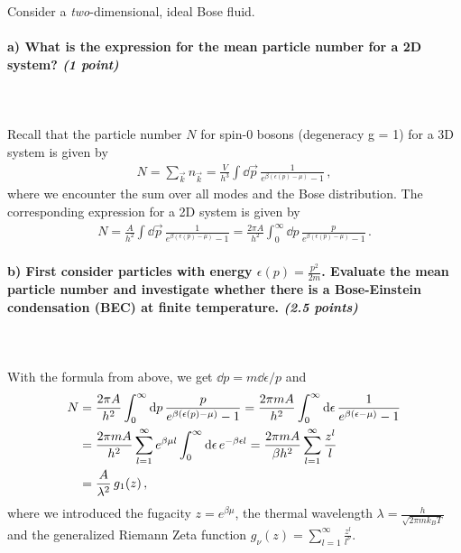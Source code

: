 Consider a \textit{two}-dimensional, ideal Bose fluid.

\paragraph{a) What is the expression for the mean particle number for a 2D system?
    \textit{(1 point)}
} \ \\
\\
Recall that the particle number $N$ for spin-0 bosons (degeneracy g = 1) 
for a 3D system is given by
\begin{align}
	N = \sum_{\vec{k}} n_{\vec{k}}
	= \frac{V}{h^3} \int \dd \vec{p} \, \frac{1}{e^{\beta (\epsilon(p) - \mu)}-1} \,,
\end{align}
where we encounter the sum over all modes and the Bose distribution. 
The corresponding expression for a 2D system is given by
\begin{align}
	N = \frac{A}{h^2} \int \dd \vec{p} \, \frac{1}{e^{\beta (\epsilon(p) - \mu)}-1}
	= \frac{2\pi A}{h^2} \int_0^{\infty} \dd p \, \frac{p}{e^{\beta (\epsilon(p) - \mu)}-1} \,.
\end{align}

\paragraph{b) First consider particles with energy $\epsilon(p)=\frac{p^2}{2m}$.
	Evaluate the mean particle number and investigate whether there is a Bose-Einstein 
	condensation (BEC) at finite temperature.
    \textit{(2.5 points)}
} \ \\
\\
With the formula from above, we get $\dd p = m \dd\epsilon / p$ and
\begin{align}
	N &= \frac{2\pi A}{h^2} \int_0^{\infty} \mathrm{d} p \, \frac{p}{e^{\beta (\epsilon(p) - \mu)}-1}
	= \frac{2\pi m A}{h^2} \int_0^{\infty} \mathrm{d}\epsilon \, \frac{1}{e^{\beta (\epsilon - \mu)}-1} \notag \\
	&= \frac{2\pi m A}{h^2} \sum_{l=1}^{\infty} e^{\beta\mu l} \int_0^{\infty} \mathrm{d}\epsilon \, e^{- \beta\epsilon l}
	= \frac{2\pi m A}{\beta h^2} \sum_{l=1}^{\infty} \frac{z^l}{l} \notag \\
	&= \frac{A}{\lambda^2} \, g_1(z) \,,
\end{align}
where we introduced the fugacity $z=e^{\beta\mu}$, the thermal wavelength $\lambda=\frac{h}{\sqrt{2\pi m k_B T}}$ 
and the generalized Riemann Zeta function $g_{\nu}(z)=\sum_{l=1}^{\infty}\frac{z^l}{l^{\nu}}$. \\


